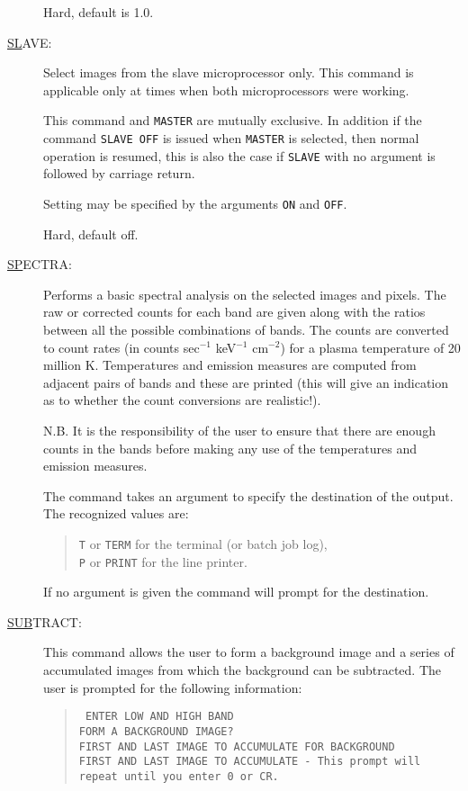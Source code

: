 \begin{description}
Hard, default is 1.0.

\item[\underline{SL}AVE: ] \label{sl}
Select images from the slave microprocessor only. This command is
applicable only at times when both microprocessors were working.

This command and {\tt MASTER} are mutually exclusive.  In addition if
the command {\tt SLAVE~OFF} is issued when {\tt MASTER} is selected,
then normal operation is resumed, this is also the case if {\tt SLAVE}
with no argument is followed by carriage return.

Setting may be specified by the arguments {\tt ON} and {\tt OFF}.

Hard, default off.

\item[\underline{SP}ECTRA: ] \label{sp}
Performs a basic spectral analysis on the selected images and pixels.
The raw or corrected counts for each band are given along with the
ratios between all the possible combinations of bands. The counts are
converted to count rates (in counts sec$^{-1}$ keV$^{-1}$ cm$^{-2}$)
for a plasma temperature of 20 million K. Temperatures and emission
measures are computed from adjacent pairs of bands and these are
printed (this will give an indication as to whether the count
conversions are realistic!).

N.B. It is the responsibility of the user to ensure that there are
enough counts in the bands before making any use of the temperatures
and emission measures.

The command takes an argument to specify the destination of the output.
The recognized values are:
\begin{quote}
{\tt T} or {\tt TERM} for the terminal (or batch job log),\\ {\tt P} or
{\tt PRINT} for the line printer.
\end{quote}
If no argument is given the command will prompt for the destination.

\item[\underline{SUB}TRACT: ] \label{sub}
This command allows the user to form a background image and a series of
accumulated images from which the background can be subtracted. The
user is prompted for the following information:
\begin{quote}\tt
ENTER LOW AND HIGH BAND\\ FORM A BACKGROUND IMAGE?\\ FIRST AND LAST
IMAGE TO ACCUMULATE FOR BACKGROUND\\ FIRST AND LAST IMAGE TO ACCUMULATE
{\rm - This prompt will repeat until you enter 0 or CR.}
\end{quote}


\end{description}
